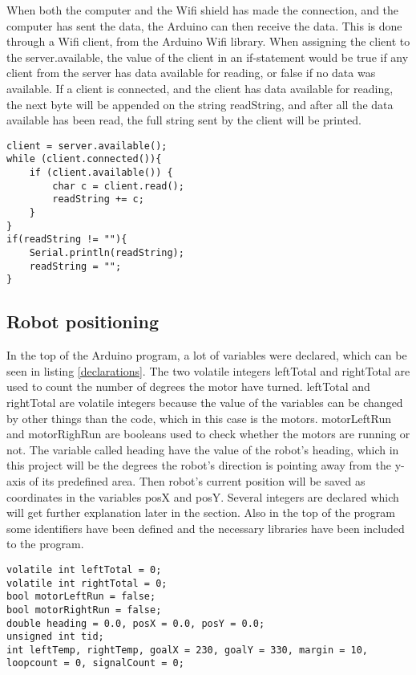 When both the computer and the Wifi shield has made the connection, and the computer has sent the data, the Arduino can then receive the data. This is done through a Wifi client, from the Arduino Wifi library. When assigning the client to the server.available, the value of the client in an if-statement would be true if any client from the server has data available for reading, or false if no data was available. If a client is connected, and the client has data available for reading, the next byte will be appended on the string readString, and after all the data available has been read, the full string sent by the client will be printed.

\begin{lstlisting}[caption={Receiving data from the computer}, label={rdc}]
client = server.available();
while (client.connected()){
	if (client.available()) {
		char c = client.read(); 
		readString += c;
	}
}
if(readString != ""){
	Serial.println(readString);
	readString = "";
}
\end{lstlisting}

\subsection{Robot positioning}
\label{sec:Robot positioning Implementation}
In the top of the Arduino program, a lot of variables were declared, which can be seen in listing \ref{declarations}. The two volatile integers leftTotal and rightTotal are used to count the number of degrees the motor have turned. leftTotal and rightTotal are volatile integers because the value of the variables can be changed by other things than the code, which in this case is the motors. \newline
motorLeftRun and motorRighRun are booleans used to check whether the motors are running or not. \newline
The variable called heading have the value of the robot's heading, which in this project will be the degrees the robot's direction is pointing away from the y-axis of its predefined area. Then robot's current position will be saved as coordinates in the variables posX and posY. \newline
Several integers are declared which will get further explanation later in the section. 
Also in the top of the program some identifiers have been defined and the necessary libraries have been included to the program.  

\begin{lstlisting}[caption={The defined and declared variables}, label={declarations}]
volatile int leftTotal = 0;
volatile int rightTotal = 0;
bool motorLeftRun = false;
bool motorRightRun = false;
double heading = 0.0, posX = 0.0, posY = 0.0;
unsigned int tid;
int leftTemp, rightTemp, goalX = 230, goalY = 330, margin = 10, loopcount = 0, signalCount = 0;
\end{lstlisting}

